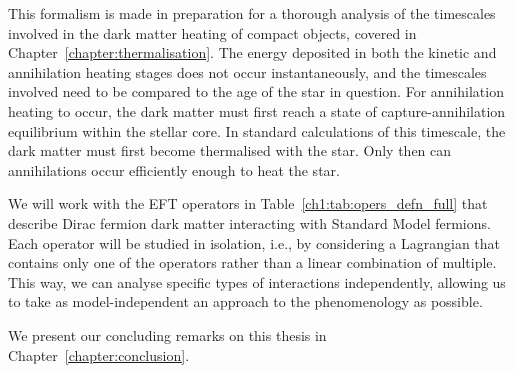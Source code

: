 This formalism is made in preparation for a thorough analysis of the timescales involved in the dark matter heating of compact objects, covered in Chapter~\ref{chapter:thermalisation}. The energy deposited in both the kinetic and annihilation heating stages does not occur instantaneously, and the timescales involved need to be compared to the age of the star in question. For annihilation heating to occur, the dark matter must first reach a state of capture-annihilation equilibrium within the stellar core. In standard calculations of this timescale, the dark matter must first become thermalised with the star. Only then can annihilations occur efficiently enough to heat the star. 


We will work with the EFT operators in Table~\ref{ch1:tab:opers_defn_full} that describe Dirac fermion dark matter interacting with Standard Model fermions. Each operator will be studied in isolation, i.e., by considering a Lagrangian that contains only one of the operators rather than a linear combination of multiple. This way, we can analyse specific types of interactions independently, allowing us to take as model-independent an approach to the phenomenology as possible. 

We present our concluding remarks on this thesis in Chapter~\ref{chapter:conclusion}.